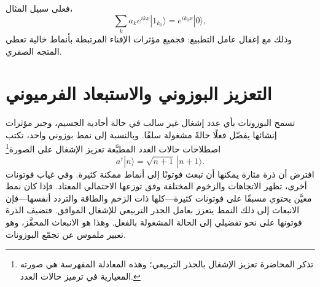 \begin{classroomqa}
\end{classroomqa}

\begin{classroomqa}
\end{classroomqa}

\begin{classroomqa}
\end{classroomqa}

فعلى سبيل المثال،
\begin{equation}
\sum_k a_k e^{ikx}|1_{k_0}\rangle
=e^{ik_0x}|0\rangle,
\end{equation}
وذلك مع إغفال عامل التطبيع: فجميع مؤثرات الإفناء المرتبطة بأنماط خالية تعطي المتجه الصفري.

\section{التعزيز البوزوني والاستبعاد الفرميوني}

تسمح البوزونات بأي عدد إشغال غير سالب في حالة أحادية الجسيم، وجبر مؤثرات إنشائها يفضّل فعلًا حالةً مشغولة سلفًا. وبالنسبة إلى نمط بوزوني واحد، تكتب اصطلاحات حالات العدد المطبَّعة تعزيز الإشغال على الصورة\footnote{تذكر المحاضرة تعزيز الإشغال بالجذر التربيعي؛ وهذه المعادلة المفهرسة هي صورته المعيارية في ترميز حالات العدد.}
\begin{equation}
a^\dagger|n\rangle=\sqrt{n+1}\,|n+1\rangle.
\end{equation}
افترض أن ذرة مثارة يمكنها أن تبعث فوتونًا إلى أنماط ممكنة كثيرة. وفي غياب فوتونات أخرى، تظهر الاتجاهات والزخوم المختلفة وفق توزعها الاحتمالي المعتاد. فإذا كان نمط معيَّن يحتوي مسبقًا على فوتونات كثيرة---كلها ذات الزخم والطاقة والتردد أنفسها---فإن الانبعاث إلى ذلك النمط يتعزز بعامل الجذر التربيعي للإشغال الموافق. فتضيف الذرة فوتونها على نحو تفضيلي إلى الحالة المشغولة بالفعل. وهذا هو الانبعاث المحفَّز، وهو تعبير ملموس عن تجمّع البوزونات.

